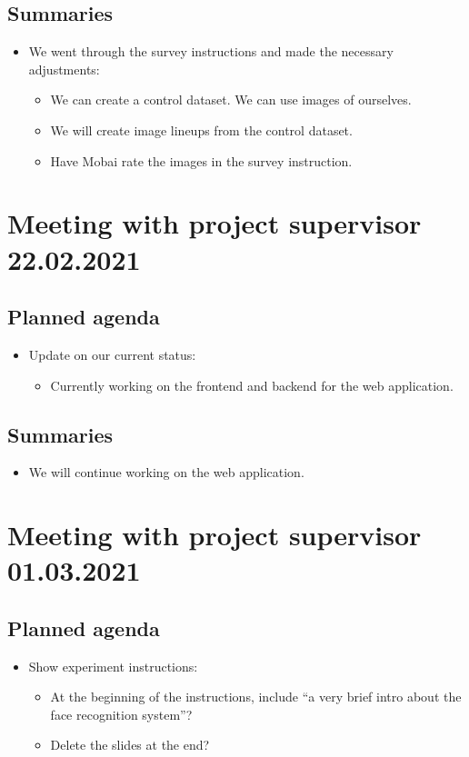 \subsection*{Summaries}
\begin{itemize}
    \item We went through the survey instructions and made the necessary adjustments:
    \begin{itemize}
        \item We can create a control dataset. We can use images of ourselves.
        \item We will create image lineups from the control dataset.
        \item Have Mobai rate the images in the survey instruction.
    \end{itemize}
\end{itemize}

\newpage

\section*{Meeting with project supervisor 22.02.2021}
\subsection*{Planned agenda}
\begin{itemize}
    \item Update on our current status:
    \begin{itemize}
        \item Currently working on the frontend and backend for the web application.
    \end{itemize}
\end{itemize}

\subsection*{Summaries}
\begin{itemize}
    \item We will continue working on the web application.
\end{itemize}

\newpage

\section*{Meeting with project supervisor 01.03.2021}
\subsection*{Planned agenda}
\begin{itemize}
    \item Show experiment instructions:
    \begin{itemize}
        \item At the beginning of the instructions, include “a very brief intro about the face recognition system”?
        \item Delete the slides at the end?
    \end{itemize}
\end{itemize}

